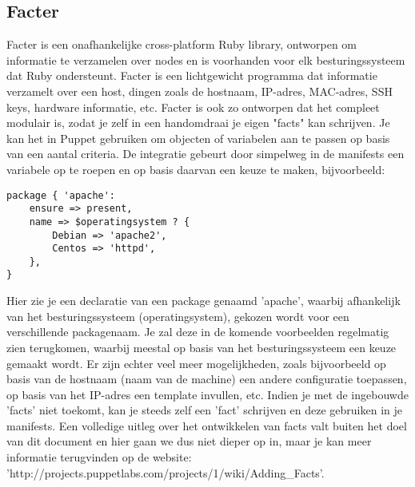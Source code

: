\subsection{Facter}
Facter is een onafhankelijke cross-platform Ruby library, ontworpen om informatie te verzamelen over nodes en is voorhanden voor elk besturingssysteem dat Ruby ondersteunt. Facter is een lichtgewicht programma dat informatie verzamelt over een host, dingen zoals de hostnaam, IP-adres, MAC-adres, SSH keys, hardware informatie, etc. Facter is ook zo ontworpen dat het compleet modulair is, zodat je zelf in een handomdraai je eigen "facts" kan schrijven. Je kan het in Puppet gebruiken om objecten of variabelen aan te passen op basis van een aantal criteria. De integratie gebeurt door simpelweg in de manifests een variabele op te roepen en op basis daarvan een keuze te maken, bijvoorbeeld:
\begin{code}
\begin{lstlisting}
package { 'apache':
	ensure => present,
	name => $operatingsystem ? {
		Debian => 'apache2',
		Centos => 'httpd',
	},
}
\end{lstlisting}
\end{code}
Hier zie je een declaratie van een package genaamd 'apache', waarbij afhankelijk van het besturingssysteem (operatingsystem), gekozen wordt voor een verschillende packagenaam. Je zal deze in de komende voorbeelden regelmatig zien terugkomen, waarbij meestal op basis van het besturingssysteem een keuze gemaakt wordt. Er zijn echter veel meer mogelijkheden, zoals bijvoorbeeld op basis van de hostnaam (naam van de machine) een andere configuratie toepassen, op basis van het IP-adres een template invullen, etc. Indien je met de ingebouwde 'facts' niet toekomt, kan je steeds zelf een 'fact' schrijven en deze gebruiken in je manifests. Een volledige uitleg over het ontwikkelen van facts valt buiten het doel van dit document en hier gaan we dus niet dieper op in, maar je kan meer informatie terugvinden op de website: 'http://projects.puppetlabs.com/projects/1/wiki/Adding\_Facts'.
